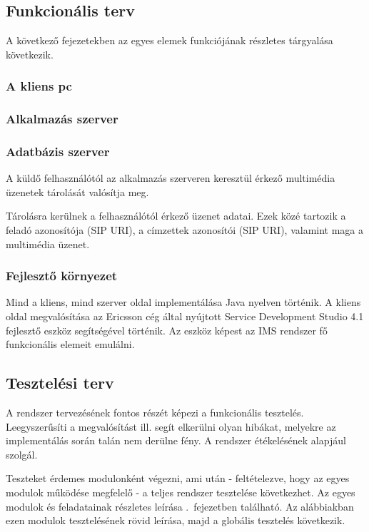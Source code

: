 \subsection{Funkcionális terv}


A következő fejezetekben az egyes elemek funkciójának részletes tárgyalása
következik.

\subsubsection{A kliens pc}
\label{sec:kliens_pc}


\subsubsection{Alkalmazás szerver}


\subsubsection{Adatbázis szerver}
\label{sec:adatbszerver}

A küldő felhasználótól az alkalmazás szerveren keresztül érkező
multimédia üzenetek tárolását valósítja meg.

Tárolásra kerülnek a felhasználótól érkező üzenet adatai. Ezek közé tartozik
a feladó azonosítója (SIP URI), a címzettek azonosítói (SIP URI), valamint maga a multimédia üzenet.

\subsubsection{Fejlesztő környezet}

Mind a kliens, mind szerver oldal implementálása Java nyelven történik. A kliens oldal megvalósítása az Ericsson cég által nyújtott Service Development Studio 4.1 fej\-lesz\-tő eszköz segítségével történik. Az eszköz képest az IMS rendszer fő funkcionális elemeit emulálni.


\subsection{Tesztelési terv}
\label{sec:tesztelesi_terv}

A rendszer tervezésének fontos részét képezi a funkcionális tesztelés. Leegyszerűsíti a megvalósítást ill. segít elkerülni olyan hibákat, melyekre az imp\-le\-men\-tá\-lás során talán nem derülne fény. A rendszer étékelésének alapjául szolgál.

Teszteket érdemes modulonként végezni, ami után - feltételezve, hogy az egyes mo\-du\-lok működése megfelelő - a teljes rendszer tesztelése következhet. %
Az egyes modulok és feladatainak részletes leírása .~fejezetben található. Az alábbiakban ezen modulok tesztelésének rövid leírása, majd a globális tesztelés következik.

